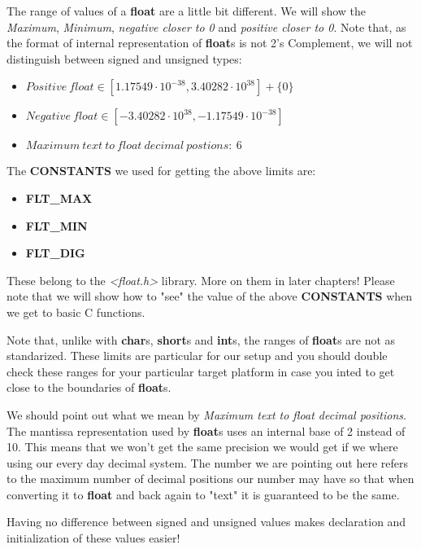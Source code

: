 \documentclass[12pt]{book}
\begin{document}
The range of values of a \textbf{float} are a little bit different. We will show the \textit{Maximum}, \textit{Minimum}, \textit{negative closer to 0} and \textit{positive closer to 0}. Note that, as the format of internal representation of \textbf{float}s is not 2's Complement, we will not distinguish between signed and unsigned types:

\begin{itemize}
  \item $Positive\ float \in [1.17549 \cdot 10^{-38}, 3.40282 \cdot 10^{38}] + \{0\}$
  \item $Negative\ float \in [-3.40282 \cdot 10^{38}, -1.17549 \cdot 10^{-38}]$
  \item $Maximum\ text\ to\ float\ decimal\ postions:\ 6$
\end{itemize}

The \textbf{CONSTANTS} we used for getting the above limits are:

\begin{itemize}
  \item \textbf{FLT\_MAX}
  \item \textbf{FLT\_MIN}
  \item \textbf{FLT\_DIG}
\end{itemize}

These belong to the \textit{\textless float.h\textgreater} library. More on them in later chapters! Please note that we will show how to "see" the value of the above \textbf{CONSTANTS} when we get to basic C functions.

Note that, unlike with \textbf{char}s, \textbf{short}s and \textbf{int}s, the ranges of \textbf{float}s are not as standarized. These limits are particular for our setup and you should double check these ranges for your particular target platform in case you inted to get close to the boundaries of \textbf{float}s.

We should point out what we mean by \textit{Maximum text to float decimal positions}. The mantissa representation used by \textbf{float}s uses an internal base of 2 instead of 10. This means that we won't get the same precision we would get if we where using our every day decimal system. The number we are pointing out here refers to the maximum number of decimal positions our number may have so that when converting it to \textbf{float} and back again to "text" it is guaranteed to be the same.


Having no difference between signed and unsigned values makes declaration and initialization of these values easier!
\end{document}
